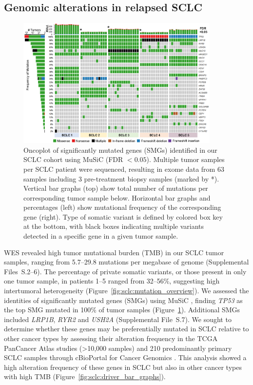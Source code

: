 \subsection{Genomic alterations in relapsed SCLC}
\begin{figure}[htb]
    \centering
        \includegraphics[width=0.9\textwidth,keepaspectratio]{images/sclc/oncoplot}
        \caption[Oncoplot of SMGs.]{Oncoplot of significantly mutated genes (SMGs) identified in our SCLC cohort using MuSiC (FDR $< 0.05$). Multiple tumor samples per SCLC patient were sequenced, resulting in exome data from 63 samples including 3 pre-treatment biopsy samples (marked by *). Vertical bar graphs (top) show total number of mutations per corresponding tumor sample below. Horizontal bar graphs and percentages (left) show mutational frequency of the corresponding gene (right). Type of somatic variant is defined by colored box key at the bottom, with black boxes indicating multiple variants detected in a specific gene in a given tumor sample.}
        \label{fig:sclc:oncoplot}
\end{figure}
WES revealed high tumor mutational burden (TMB) in our SCLC tumor samples, ranging from 5.7--29.8 mutations per megabase of genome (Supplemental Files~S\thechapter{}.2--6). The percentage of private somatic variants, or those present in only one tumor sample, in patients 1--5 ranged from 32--56\%, suggesting high intertumoral heterogeneity (Figure~\ref{fig:sclc:mutation_overview}). We assessed the identities of significantly mutated genes (SMGs) using MuSiC \cite{dees2012}, finding \textit{TP53} as the top SMG mutated in 100\% of tumor samples (Figure~\ref{fig:sclc:oncoplot}). Additional SMGs included \textit{LRP1B}, \textit{RYR2} and \textit{USH2A} (Supplemental File~S\thechapter{}.7). We sought to determine whether these genes may be preferentially mutated in SCLC relative to other cancer types by assessing their alteration frequency in the TCGA PanCancer Atlas studies (\textgreater{}10,000 samples) and 210 predominantly primary SCLC samples \cite{george2015,rudin2012,peifer2012,gardner2017} through cBioPortal for Cancer Genomics \cite{cerami2012,gao2013}. This analysis showed a high alteration frequency of these genes in SCLC but also in other cancer types with high TMB (Figure~\ref{fig:sclc:driver_bar_graphs}).

